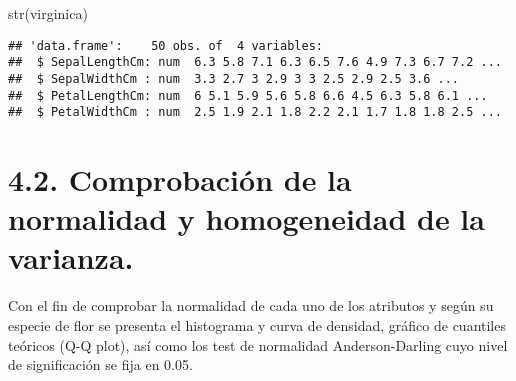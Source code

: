 \documentclass[
]{article}
\newenvironment{Shaded}{\begin{snugshade}}{\end{snugshade}}
\newcommand{\FunctionTok}[1]{\textcolor[rgb]{0.00,0.00,0.00}{#1}}
\newcommand{\NormalTok}[1]{#1}
\begin{document}
\begin{Shaded}
\begin{Highlighting}[]
\FunctionTok{str}\NormalTok{(virginica)}
\end{Highlighting}
\end{Shaded}

\begin{verbatim}
## 'data.frame':    50 obs. of  4 variables:
##  $ SepalLengthCm: num  6.3 5.8 7.1 6.3 6.5 7.6 4.9 7.3 6.7 7.2 ...
##  $ SepalWidthCm : num  3.3 2.7 3 2.9 3 3 2.5 2.9 2.5 3.6 ...
##  $ PetalLengthCm: num  6 5.1 5.9 5.6 5.8 6.6 4.5 6.3 5.8 6.1 ...
##  $ PetalWidthCm : num  2.5 1.9 2.1 1.8 2.2 2.1 1.7 1.8 1.8 2.5 ...
\end{verbatim}

\hypertarget{comprobaciuxf3n-de-la-normalidad-y-homogeneidad-de-la-varianza.}{%
\section{4.2. Comprobación de la normalidad y homogeneidad de la
varianza.}\label{comprobaciuxf3n-de-la-normalidad-y-homogeneidad-de-la-varianza.}}

Con el fin de comprobar la normalidad de cada uno de los atributos y
según su especie de flor se presenta el histograma y curva de densidad,
gráfico de cuantiles teóricos (Q-Q plot), así como los test de
normalidad Anderson-Darling cuyo nivel de significación se fija en 0.05.
\end{document}

